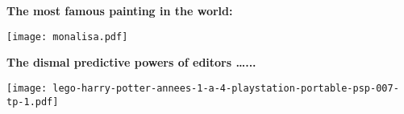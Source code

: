 












  \textbf{The most famous painting in the world:}

  \begin{center}
    \texttt{[image: monalisa.pdf]}%
  \end{center}





  \textbf{The dismal predictive powers of editors \ldots...}

  \begin{center}
    \texttt{[image: lego-harry-potter-annees-1-a-4-playstation-portable-psp-007-tp-1.pdf]}
  \end{center}




